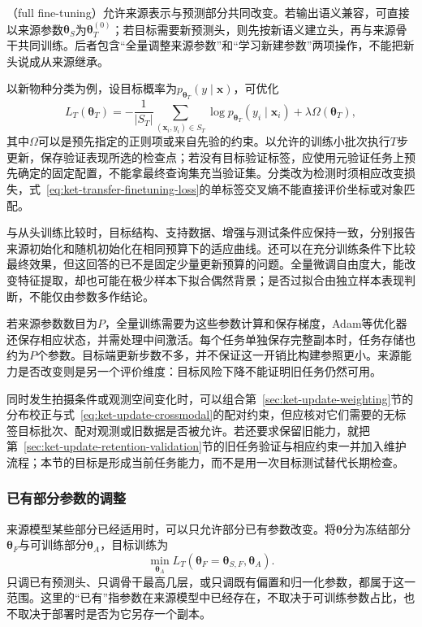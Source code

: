 （full fine-tuning）允许来源表示与预测部分共同改变。若输出语义兼容，可直接以来源参数$\bm{\theta}_S$为$\bm{\theta}_T^{(0)}$；若目标需要新预测头，则先按新语义建立头，再与来源骨干共同训练。后者包含“全量调整来源参数”和“学习新建参数”两项操作，不能把新头说成从来源继承。

以新物种分类为例，设目标概率为$p_{\bm{\theta}_T}(y\mid\bm x)$，可优化
\begin{equation}
  L_T(\bm{\theta}_T)
   =-\frac1{|S_T|}\sum_{(\bm x_i,y_i)\in S_T}
       \log p_{\bm{\theta}_T}(y_i\mid\bm x_i)
       +\lambda\Omega(\bm{\theta}_T),
  \label{eq:ket-transfer-finetuning-loss}
\end{equation}
其中$\Omega$可以是预先指定的正则项或来自先验的约束。以允许的训练小批次执行$T$步更新，保存验证表现所选的检查点；若没有目标验证标签，应使用元验证任务上预先确定的固定配置，不能拿最终查询集充当验证集。分类改为检测时须相应改变损失，式~\eqref{eq:ket-transfer-finetuning-loss}的单标签交叉熵不能直接评价坐标或对象匹配。

与从头训练比较时，目标结构、支持数据、增强与测试条件应保持一致，分别报告来源初始化和随机初始化在相同预算下的适应曲线。还可以在充分训练条件下比较最终效果，但这回答的已不是固定少量更新预算的问题。全量微调自由度大，能改变特征提取，却也可能在极少样本下拟合偶然背景；是否过拟合由独立样本表现判断，不能仅由参数多作结论。

若来源参数数目为$P$，全量训练需要为这些参数计算和保存梯度，Adam等优化器还保存相应状态，并需处理中间激活。每个任务单独保存完整副本时，任务存储也约为$P$个参数。目标端更新步数不多，并不保证这一开销比构建参照更小。来源能力是否改变则是另一个评价维度：目标风险下降不能证明旧任务仍然可用。

同时发生拍摄条件或观测空间变化时，可以组合第~\ref{sec:ket-update-weighting}节的分布校正与式~\eqref{eq:ket-update-crossmodal}的配对约束，但应核对它们需要的无标签目标批次、配对观测或旧数据是否被允许。若还要求保留旧能力，就把第~\ref{sec:ket-update-retention-validation}节的旧任务验证与相应约束一并加入维护流程；本节的目标是形成当前任务能力，而不是用一次目标测试替代长期检查。

\subsubsection{已有部分参数的调整}
\label{sec:ket-transfer-existing-parameters}

来源模型某些部分已经适用时，可以只允许部分已有参数改变。将$\bm{\theta}$分为冻结部分$\bm{\theta}_F$与可训练部分$\bm{\theta}_A$，目标训练为
\[
  \min_{\bm{\theta}_A}
  L_T(\bm{\theta}_F=\bm{\theta}_{S,F},\bm{\theta}_A).
\]
只调已有预测头、只调骨干最高几层，或只调既有偏置和归一化参数，都属于这一范围。这里的“已有”指参数在来源模型中已经存在，不取决于可训练参数占比，也不取决于部署时是否为它另存一个副本。

